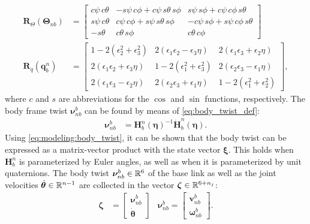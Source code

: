 \begin{subequations}
\begin{align}
    \bm{R}_{\Theta}(\bm{\Theta}_{nb}) &= \begin{bmatrix}
        c\psi\, c\theta & -s\psi\, c\phi + c\psi\, s\theta\, s\phi & s\psi\, s\phi + c\psi\, c\phi\, s\theta \\
        s\psi\, c\theta & c\psi\, c\phi + s\psi\, s\theta\, s\phi & -c\psi\,s\phi + s\psi\, c\phi\, s\theta \\
        -s\theta & c\theta\, s\phi & c\theta\, c\phi
    \end{bmatrix} \\
    \bm{R}_{q}(\bm{q}_b^n) &= \begin{bmatrix}
        1 - 2(\epsilon_2^2 + \epsilon_3^2) & 2(\epsilon_1\epsilon_2 - \epsilon_3\eta) & 2(\epsilon_1\epsilon_3 + \epsilon_2\eta) \\
        2(\epsilon_1\epsilon_2 + \epsilon_3\eta) & 1 - 2(\epsilon_1^2 + \epsilon_3^2) & 2(\epsilon_2\epsilon_3 - \epsilon_1\eta) \\
        2(\epsilon_1\epsilon_3 - \epsilon_2\eta) & 2(\epsilon_2\epsilon_3 + \epsilon_1\eta) & 1 - 2(\epsilon_1^2 + \epsilon_2^2)
    \end{bmatrix},
\end{align}
\end{subequations}
where $c$ and $s$ are abbreviations for the $\cos$ and $\sin$ functions, respectively. The body
frame twist $\bm{\nu}_{nb}^b$ can be found by means of \autoref{eq:body_twist_def}:
\begin{align}
    \label{eq:modeling:body_twist}
    \bm{\nu}_{nb}^b &= \bm{H}_b^n(\bm{\eta})^{-1} \dot{\bm{H}}_b^n(\bm{\eta}).
\end{align}
Using \autoref{eq:modeling:body_twist}, it can be shown that the body twist can be expressed
as a matrix-vector product with the state vector $\bm{\xi}$. This holds when $\bm{H}_b^n$ is parameterized by Euler angles,
as well as when it is parameterized by unit quaternions. The body twist
$\bm{\nu}_{nb}^b \in \mathbb{R}^6$ of the base link as well as the joint velocities
$\dot{\bm{\theta}} \in \mathbb{R}^{n-1}$ are collected in the vector $\bm{\zeta} \in \mathbb{R}^{6+n_j}$:
\begin{align}
    \bm{\zeta} &= \begin{bmatrix}\bm{\nu}_{nb}^b \\ \dot{\bm{\theta}}\end{bmatrix} &
        \bm{\nu}_{nb}^b = \begin{bmatrix} \bm{v}_{nb}^b \\ \bm{\omega}_{nb}^b\end{bmatrix}. 
\end{align}
